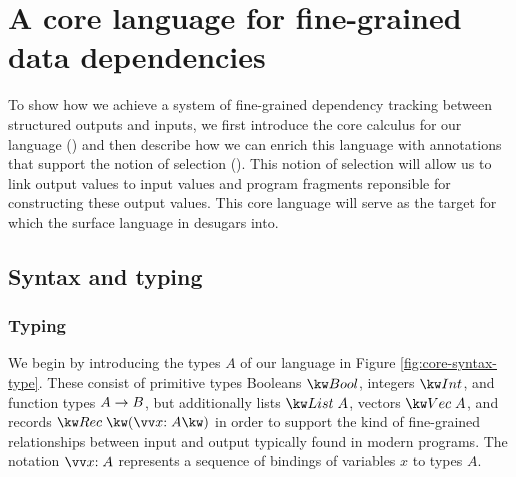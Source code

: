 \newpage

\section{A core language for fine-grained data dependencies}
\label{sec:core-language}

To show how we achieve a system of fine-grained dependency tracking between structured outputs and inputs, we first introduce the core calculus for our language () and then describe how we can enrich this language with annotations that support the notion of selection (). This notion of selection will allow us to link output values to input values and program fragments reponsible for constructing these output values. This core language will serve as the target for which the surface language in  desugars into.

\subsection{Syntax and typing}
\label{sec:core-language:syntax-typing}
\subsubsection{Typing}
We begin by introducing the types $A$ of our language in Figure \ref{fig:core-syntax-type}. These consist of primitive types Booleans $\tyBool$, integers $\tyInt$, and function types ${A}\rightarrow{B}$, but additionally lists $\tyList{A}$, vectors $\tyVec{A}$, and records $\tyRec{\vec{\bind{x}{A}}}$ in order to support the kind of fine-grained relationships between input and output typically found in modern programs. The notation $\seq{\bind{x}{A}}$ represents a sequence of bindings of variables $x$ to types $A$.

 


